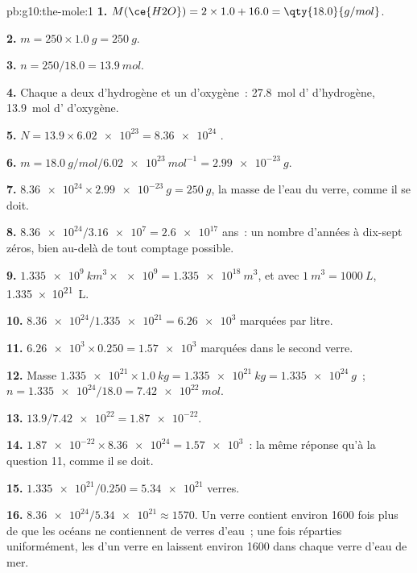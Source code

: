 \begin{solution}{pb:g10:the-mole:1}
\textbf{1.} $M(\ce{H2O}) = 2 \times 1.0 + 16.0 = \qty{18.0}{g/mol}$.

\textbf{2.} $m = 250 \times \qty{1.0}{g} = \qty{250}{g}$.

\textbf{3.} $n = 250 / 18.0 = \qty{13.9}{mol}$.

\textbf{4.} Chaque  a deux  d'hydrogène et un 
d'oxygène~: \qty{27.8}{mol} d' d'hydrogène, \qty{13.9}{mol}
d' d'oxygène.

\textbf{5.} $N = 13.9 \times \num{6.02e23} = \num{8.36e24}$ .

\textbf{6.} $m = \qty{18.0}{g/mol} / \qty{6.02e23}{mol^{-1}} =
\qty{2.99e-23}{g}$.

\textbf{7.} $\num{8.36e24} \times \qty{2.99e-23}{g} = \qty{250}{g}$, la
masse de l'eau du verre, comme il se doit.

\textbf{8.} $\num{8.36e24} / \num{3.16e7} = \num{2.6e17}$ ans~: un nombre
d'années à dix-sept zéros, bien au-delà de tout comptage possible.

\textbf{9.} $\qty{1.335e9}{km^3} \times \num{e9} = \qty{1.335e18}{m^3}$,
et avec $\qty{1}{m^3} = \qty{1000}{L}$, \qty{1.335e21}{L}.

\textbf{10.} $\num{8.36e24} / \num{1.335e21} = \num{6.26e3}$ 
marquées par litre.

\textbf{11.} $\num{6.26e3} \times 0.250 = \num{1.57e3}$ 
marquées dans le second verre.

\textbf{12.} Masse $\num{1.335e21} \times \qty{1.0}{kg} =
\qty{1.335e21}{kg} = \qty{1.335e24}{g}$~; $n = \num{1.335e24} / 18.0 =
\qty{7.42e22}{mol}$.

\textbf{13.} $13.9 / \num{7.42e22} = \num{1.87e-22}$.

\textbf{14.} $\num{1.87e-22} \times \num{8.36e24} = \num{1.57e3}$~: la
même réponse qu'à la question 11, comme il se doit.

\textbf{15.} $\num{1.335e21} / 0.250 = \num{5.34e21}$ verres.

\textbf{16.} $\num{8.36e24} / \num{5.34e21} \approx 1570$. Un verre
contient environ 1600 fois plus de  que les océans ne
contiennent de verres d'eau~; une fois réparties uniformément, les
 d'un verre en laissent environ 1600 dans chaque verre d'eau de
mer.


\end{solution}
